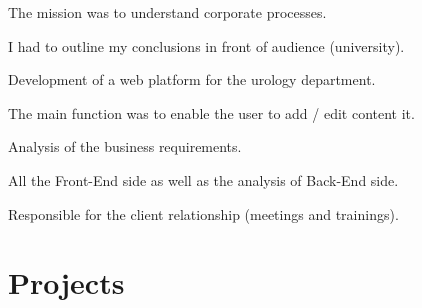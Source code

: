 \documentclass[letterpaper]{my-resume} %
\begin{document}
\begin{minipage}[t]{0.66\textwidth}
\begin{tightitemize}
\item The mission was to understand corporate processes.
\item I had to outline my conclusions in front of audience (university).
\end{tightitemize}

\sectionspace %



\begin{tightitemize}
\item Development of a web platform for the urology department.
\item The main function was to enable the user to add / edit content it.
\item Analysis of the business requirements.
\item All the Front-End side as well as the analysis of Back-End side.
\item Responsible for the client relationship (meetings and trainings).
\end{tightitemize}

\sectionspace %


\section{Projects}

\end{minipage}
\end{document}

